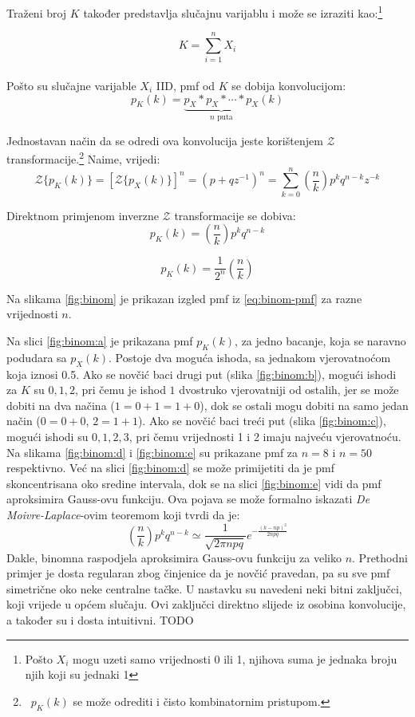 Traženi broj $K$ također predstavlja slučajnu varijablu i može se izraziti
kao:\footnote{Pošto $X_i$ mogu uzeti samo vrijednosti 0 ili 1, njihova suma je
jednaka broju njih koji su jednaki 1}

$$K = \sum_{i=1}^{n} X_i$$
\\

Pošto su slučajne varijable $X_i$ IID, pmf od $K$ se dobija konvolucijom:
$$p_K(k) = \underbrace{p_X * p_X * \cdots * p_X}_{n\text{ puta}}(k)$$

Jednostavan način da se odredi ova konvolucija jeste korištenjem
$\mathcal{Z}$ transformacije.\footnote{\ $p_K(k)$ se može odrediti i čisto
kombinatornim pristupom.}
Naime, vrijedi: %
\begin{equation}
  \mathcal{Z}\{p_K(k)\}
  = \left[\mathcal{Z}\{p_X(k)\}\right]^n
  = (p+qz^{-1})^n
  = \sum_{k=0}^{n} \left(\frac{n}{k}\right) p^k q^{n-k} z^{-k}
\end{equation}

Direktnom primjenom inverzne $ \mathcal{Z}$ transformacije se dobiva:
$$p_K(k) = \left(\frac{n}{k}\right) p^kq^{n-k}$$

\begin{equation} \label{eq:binom-pmf}
  p_K(k) = \frac{1}{2^n} \left(\frac{n}{k}\right)
\end{equation}

Na slikama \ref{fig:binom} je prikazan izgled pmf iz \eqref{eq:binom-pmf} za
razne vrijednosti $n$.

Na slici \ref{fig:binom:a} je prikazana pmf $p_K(k)$, za jedno bacanje, koja se
naravno podudara sa $p_X(k)$. Postoje dva moguća ishoda, sa jednakom
vjerovatnoćom koja iznosi 0.5. Ako se novčić baci drugi put (slika
\ref{fig:binom:b}), mogući ishodi za $K$ su $0, 1, 2$, pri čemu je ishod $1$
dvostruko vjerovatniji od ostalih, jer se može dobiti na dva načina
($1=0+1=1+0$), dok se ostali mogu dobiti na samo jedan način ($0=0+0$, $2=1+1$).
Ako se novčić baci treći put (slika \ref{fig:binom:c}), mogući ishodi su
$0,1,2,3$, pri čemu vrijednosti 1 i 2 imaju najveću vjerovatnoću. Na slikama
\ref{fig:binom:d} i \ref{fig:binom:e} su prikazane pmf za $n=8$ i $n=50$
respektivno. Već na slici \ref{fig:binom:d} se može primijetiti da je pmf
skoncentrisana oko sredine intervala, dok se na slici \ref{fig:binom:e} vidi da
pmf aproksimira Gauss-ovu funkciju. Ova pojava se može formalno iskazati
\textit{De Moivre-Laplace}-ovim teoremom koji tvrdi da je:
\begin{equation}
  \left(\frac{n}{k}\right) p^kq^{n-k} \simeq \frac{1}{\sqrt{2\pi npq}}
  e^{-\frac{(k-np)^2}{2npq}}
\end{equation}
Dakle, binomna raspodjela aproksimira Gauss-ovu funkciju za veliko $n$.
Prethodni primjer je dosta regularan zbog činjenice da je novčić pravedan, pa su
sve pmf simetrične oko neke centralne tačke. U nastavku su navedeni neki bitni
zaključci, koji vrijede u općem slučaju. Ovi zaključci direktno slijede iz
osobina konvolucije, a također su i dosta intuitivni.
TODO

